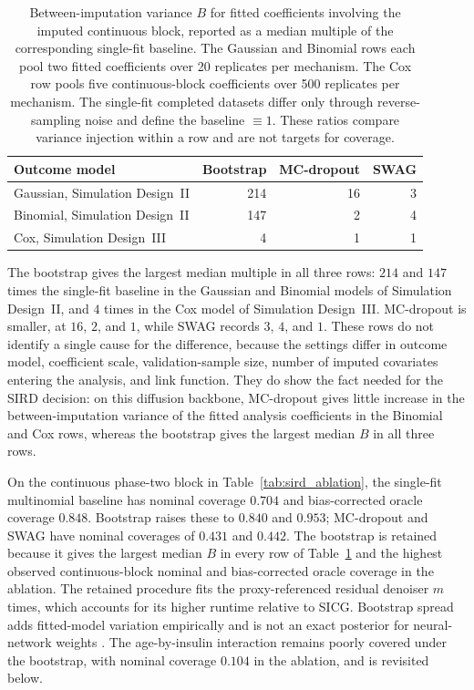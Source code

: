 \begin{table}[!htbp]
\centering
\caption{Between-imputation variance \(B\) for fitted coefficients involving the imputed continuous block, reported as a median multiple of the corresponding single-fit baseline. The Gaussian and Binomial rows each pool two fitted coefficients over 20 replicates per mechanism. The Cox row pools five continuous-block coefficients over 500 replicates per mechanism. The single-fit completed datasets differ only through reverse-sampling noise and define the baseline \(\equiv1\). These ratios compare variance injection within a row and are not targets for coverage.}
\label{tab:sird_bm}
\begin{tabular}{lrrr}
\toprule
Outcome model & Bootstrap & MC-dropout & SWAG \\
\midrule
Gaussian, Simulation Design~II & 214 & 16 & 3 \\
Binomial, Simulation Design~II & 147 & 2 & 4 \\
Cox, Simulation Design~III & 4 & 1 & 1 \\
\bottomrule
\end{tabular}
\end{table}

The bootstrap gives the largest median multiple in all three rows: \(214\) and \(147\) times the single-fit baseline in the Gaussian and Binomial models of Simulation Design~II, and \(4\) times in the Cox model of Simulation Design~III. MC-dropout is smaller, at \(16\), \(2\), and \(1\), while SWAG records \(3\), \(4\), and \(1\). These rows do not identify a single cause for the difference, because the settings differ in outcome model, coefficient scale, validation-sample size, number of imputed covariates entering the analysis, and link function. They do show the fact needed for the SIRD decision: on this diffusion backbone, MC-dropout gives little increase in the between-imputation variance of the fitted analysis coefficients in the Binomial and Cox rows, whereas the bootstrap gives the largest median \(B\) in all three rows.

On the continuous phase-two block in Table~\ref{tab:sird_ablation}, the single-fit multinomial baseline has nominal coverage \(0.704\) and bias-corrected oracle coverage \(0.848\). Bootstrap raises these to \(0.840\) and \(0.953\); MC-dropout and SWAG have nominal coverages of \(0.431\) and \(0.442\). The bootstrap is retained because it gives the largest median \(B\) in every row of Table~\ref{tab:sird_bm} and the highest observed continuous-block nominal and bias-corrected oracle coverage in the ablation. The retained procedure fits the proxy-referenced residual denoiser \(m\) times, which accounts for its higher runtime relative to SICG. Bootstrap spread adds fitted-model variation empirically and is not an exact posterior for neural-network weights \citep{bartlett2020bootstrap}. The age-by-insulin interaction remains poorly covered under the bootstrap, with nominal coverage \(0.104\) in the ablation, and is revisited below.

